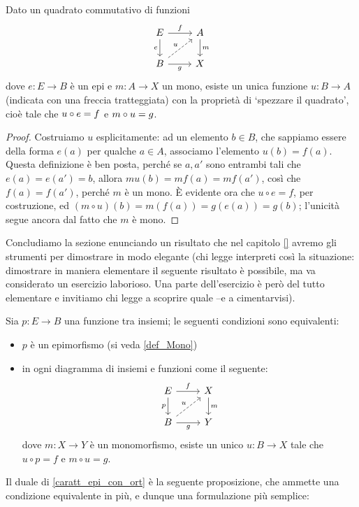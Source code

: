 \begin{proposition}
	Dato un quadrato commutativo di funzioni
	\[\begin{tikzcd}
			E \ar[r,"f"]\ar[d, "e"']& A\ar[d, "m"] \\
			B \ar[r, "g"']\ar[ur,dashed,"u"] & X
		\end{tikzcd}\]
	dove \(e : E\to B\) è un epi e \(m : A \to X\) un mono, esiste un unica funzione \(u : B\to A\) (indicata con una freccia tratteggiata) con la proprietà di `spezzare il quadrato', cioè tale che \(u\circ e=f\) e \(m\circ u=g\).
\end{proposition}
\begin{proof}
	Costruiamo \(u\) esplicitamente: ad un elemento \(b\in B\), che sappiamo essere della forma \(e(a)\) per qualche \(a\in A\), associamo l'elemento \(u(b)=f(a)\). Questa definizione è ben posta, perché se \(a,a'\) sono entrambi tali che \(e(a)=e(a')=b\), allora \(mu(b)=mf(a)=mf(a')\), così che \(f(a)=f(a')\), perché \(m\) è un mono. \`E evidente ora che \(u\circ e= f\), per costruzione, ed \((m\circ u)(b)=m(f(a))=g(e(a))=g(b)\); l'unicità segue ancora dal fatto che \(m\) è mono.
\end{proof}
Concludiamo la sezione enunciando un risultato che nel capitolo \ref{} avremo gli strumenti per dimostrare in modo elegante (chi legge interpreti così la situazione: dimostrare in maniera elementare il seguente risultato è possibile, ma va considerato un esercizio laborioso. Una parte dell'esercizio è però del tutto elementare e invitiamo chi legge a scoprire quale --e a cimentarvisi). 
\begin{proposition}\label{caratt_epi_con_ort}
Sia $p : E \to B$ una funzione tra insiemi; le seguenti condizioni sono equivalenti:
\begin{itemize}
  \item $p$ è un epimorfismo (si veda \ref{def_Mono})
  \item in ogni diagramma di insiemi e funzioni come il seguente: 
    \[\begin{tikzcd}
      E \ar[r, "f"]\ar[d, "p"']& X \ar[d, "m"]\\ 
      B \ar[r, "g"'] \ar[ur, dashed, "u"]& Y
    \end{tikzcd}\]
    dove $m : X\to Y$ è un monomorfismo, esiste un unico $u : B\to X$ tale che $u\circ p = f$ e $m\circ u = g$.
\end{itemize}
\end{proposition}
Il duale di \ref{caratt_epi_con_ort} è la seguente proposizione, che ammette una condizione equivalente in più, e dunque una formulazione più semplice: 
